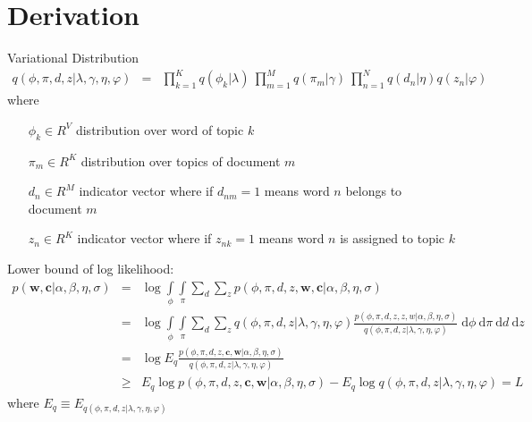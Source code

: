 \documentclass[]{article}
\title{}
\author{}
\begin{document}
\maketitle

\begin{abstract}

\end{abstract}

\section{Derivation}

Variational Distribution
\begin{eqnarray}
q(\phi,\pi,d,z | \lambda,\gamma,\eta,\varphi) &=& \prod\limits_{k=1}^{K}q(\phi_k|\lambda) \: \prod\limits_{m=1}^{M}q(\pi_m|\gamma) \: \prod\limits_{n=1}^{N}q(d_n | \eta) q(z_n | \varphi)
\end{eqnarray}
where 
\begin{itemize}
	\item[$\phi_k \in R^V$] distribution over word of topic $k$
	\item[$\pi_m \in R^K$] distribution over topics of document $m$
	\item[$d_n \in R^M$] indicator vector where if $d_{nm} = 1$ means word $n$ belongs to document $m$
	\item[$z_n \in R^K$] indicator vector where if $z_{nk} = 1$ means word $n$ is assigned to topic $k$
\end{itemize}

Lower bound of log likelihood:
\begin{eqnarray}
p(\boldsymbol{w}, \boldsymbol{c} | \alpha,\beta,\eta,\sigma) &=& \log \int\limits_{\phi} \int\limits_{\pi} \sum\limits_{d} \sum\limits_{z} p(\phi,\pi,d,z,\boldsymbol{w},\boldsymbol{c} | \alpha,\beta,\eta,\sigma) \\
&=&  \log \int\limits_{\phi} \int\limits_{\pi} \sum\limits_{d} \sum\limits_{z} q(\phi,\pi,d,z | \lambda,\gamma,\eta,\varphi) \frac{p(\phi,\pi,d,z,z,w | \alpha,\beta,\eta,\sigma)}{q(\phi,\pi,d,z | \lambda,\gamma,\eta,\varphi)} \; \mathrm{d}\phi \: \mathrm{d}\pi \: \mathrm{d}d \: \mathrm{d}z\\
&=& \log E_q \frac{p(\phi,\pi,d,z,\boldsymbol{c},\boldsymbol{w} | \alpha,\beta,\eta,\sigma)}{q(\phi,\pi,d,z | \lambda,\gamma,\eta,\varphi)} \\
&\ge& E_q \log p(\phi,\pi,d,z,\boldsymbol{c},\boldsymbol{w} | \alpha,\beta,\eta,\sigma) - E_q \log q(\phi,\pi,d,z | \lambda,\gamma,\eta,\varphi) = L
\end{eqnarray}
where $E_q \equiv E_{q(\phi,\pi,d,z | \lambda,\gamma,\eta,\varphi)}$
\end{document}
